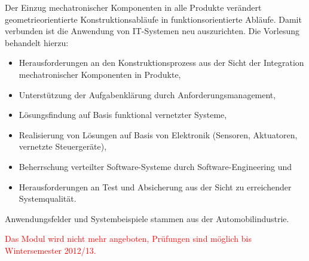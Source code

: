 \begin{module}
\begin{content}
Der Einzug mechatronischer Komponenten in alle Produkte verändert geometrieorientierte Konstruktionsabläufe in funktionsorientierte Abläufe. Damit verbunden ist die Anwendung von IT-Systemen neu auszurichten. Die Vorlesung behandelt hierzu:

 \begin{itemize}\item Herausforderungen an den Konstruktionsprozess aus der Sicht der Integration mechatronischer Komponenten in Produkte,  \item Unterstützung der Aufgabenklärung durch Anforderungsmanagement,  \item Lösungsfindung auf Basis funktional vernetzter Systeme,  \item Realisierung von Lösungen auf Basis von Elektronik (Sensoren, Aktuatoren, vernetzte Steuergeräte),  \item Beherrschung verteilter Software-Systeme durch Software-Engineering und  \item Herausforderungen an Test und Absicherung aus der Sicht zu erreichender Systemqualität.   \end{itemize}

Anwendungsfelder und Systembeispiele stammen aus der Automobilindustrie.


\end{content}

\begin{remarks}\textcolor{red}{Das Modul wird nicht mehr angeboten, Prüfungen sind möglich bis Wintersemester 2012/13.}

\end{remarks}

\end{module}

